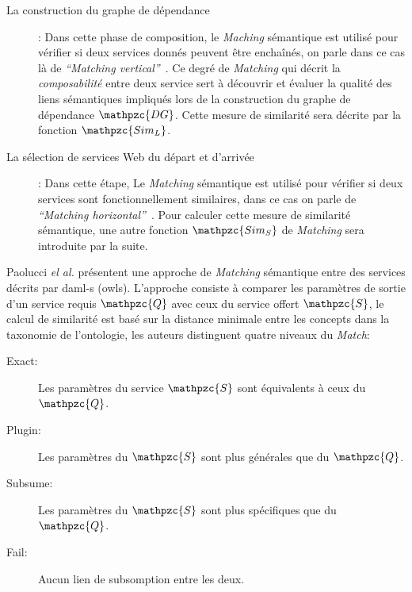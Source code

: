 \begin{description}
\item [La construction du graphe de dépendance]: Dans cette phase de
  composition, le \emph{Maching} sémantique est utilisé pour vérifier
  si deux services donnés peuvent être enchaînés, on parle dans ce cas
  là de \emph{``Matching vertical''}~\cite{temglit2012graph}. Ce degré
  de \emph{Matching} qui décrit la \emph{composabilité} entre deux
  service sert à découvrir et évaluer la qualité des liens sémantiques
  impliqués lors de la construction du graphe de dépendance
  $\mathpzc{DG}$. Cette mesure de similarité sera décrite par la
  fonction {\large $\mathpzc{Sim_L}$}.\

\item [La sélection de services Web du départ et d'arrivée]: Dans
  cette étape, Le \emph{Matching} sémantique est utilisé pour vérifier
  si deux services sont fonctionnellement similaires, dans ce cas on
  parle de \emph{``Matching
    horizontal''}~\cite{temglit2012graph}. Pour calculer cette mesure
  de similarité sémantique, une autre fonction {\large
    $\mathpzc{Sim_S}$} de \emph{Matching} sera introduite par la
  suite.\medskip
\end{description}

Paolucci \emph{el al.} \cite{paolucci2002semantic} présentent une
approche de \emph{Matching} sémantique entre des services décrits par
\acrshort{daml-s} (\acrshort{owls}). L'approche consiste à comparer
les paramètres de sortie d'un service requis {\large $\mathpzc{Q}$}
avec ceux du service offert {\large $\mathpzc{S}$}, le calcul de
similarité est basé sur la distance minimale entre les concepts dans
la taxonomie de l'ontologie, les auteurs distinguent quatre niveaux du
\emph{Match}:\medskip

\begin{description}
\item [Exact:] Les paramètres du service {\large $\mathpzc{S}$} sont
  équivalents à ceux du {\large $\mathpzc{Q}$}.

\item [Plugin:] Les paramètres du {\large $\mathpzc{S}$} sont plus
  générales que du {\large $\mathpzc{Q}$}.

\item [Subsume:] Les paramètres du {\large $\mathpzc{S}$} sont plus
  spécifiques que du {\large $\mathpzc{Q}$}.

\item [Fail:] Aucun lien de subsomption entre les deux.\medskip
\end{description}

